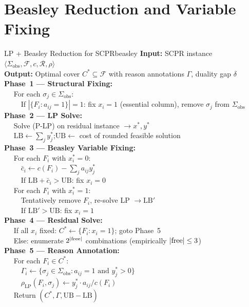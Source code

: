 \documentclass[11pt,a4paper]{report}
\newcommand{\calF}{\mathcal{F}}
\newcommand{\calR}{\mathcal{R}}
\begin{document}
\section{Beasley Reduction and Variable Fixing}

\begin{algorithm_box}{LP + Beasley Reduction for SCPR}{beasley}
\textbf{Input:} SCPR instance $\langle \Sigma_{\mathrm{obs}}, \calF, c, \calR, \rho \rangle$\\
\textbf{Output:} Optimal cover $C^* \subseteq \calF$ with reason annotations $\Gamma$, duality gap $\delta$\\[6pt]
\textbf{Phase~1 --- Structural Fixing:}\\
$\quad$ For each $\sigma_j \in \Sigma_{\mathrm{obs}}$:\\
$\quad\quad$ If $|\{F_i : a_{ij}=1\}| = 1$: fix $x_i = 1$ (essential column), remove $\sigma_j$ from $\Sigma_{\mathrm{obs}}$\\[4pt]
\textbf{Phase~2 --- LP Solve:}\\
$\quad$ Solve (P-LP) on residual instance $\to x^*, y^*$\\
$\quad$ $\mathrm{LB} \leftarrow \sum_j y_j^*$;\quad $\mathrm{UB} \leftarrow$ cost of rounded feasible solution\\[4pt]
\textbf{Phase~3 --- Beasley Variable Fixing:}\\
$\quad$ For each $F_i$ with $x_i^* = 0$:\\
$\quad\quad$ $\bar{c}_i \leftarrow c(F_i) - \sum_j a_{ij} y_j^*$\\
$\quad\quad$ If $\mathrm{LB} + \bar{c}_i > \mathrm{UB}$: fix $x_i = 0$\\
$\quad$ For each $F_i$ with $x_i^* = 1$:\\
$\quad\quad$ Tentatively remove $F_i$, re-solve LP $\to \mathrm{LB}'$\\
$\quad\quad$ If $\mathrm{LB}' > \mathrm{UB}$: fix $x_i = 1$\\[4pt]
\textbf{Phase~4 --- Residual Solve:}\\
$\quad$ If all $x_i$ fixed: $C^* \leftarrow \{F_i : x_i = 1\}$; goto Phase~5\\
$\quad$ Else: enumerate $2^{|{\rm free}|}$ combinations (empirically $|{\rm free}| \leq 3$)\\[4pt]
\textbf{Phase~5 --- Reason Annotation:}\\
$\quad$ For each $F_i \in C^*$:\\
$\quad\quad$ $\Gamma_i \leftarrow \{\sigma_j \in \Sigma_{\mathrm{obs}} : a_{ij}=1 \text{ and } y_j^* > 0\}$\\
$\quad\quad$ $\rho_{\mathrm{LP}}(F_i, \sigma_j) \leftarrow y_j^* \cdot a_{ij} / c(F_i)$\\
$\quad$ Return $(C^*, \Gamma, \mathrm{UB} - \mathrm{LB})$
\end{algorithm_box}
\end{document}
